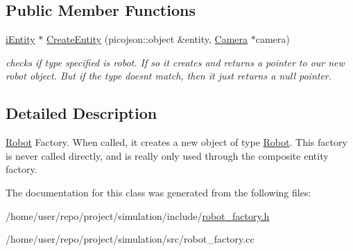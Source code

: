 \subsection*{Public Member Functions}
\begin{DoxyCompactItemize}
\item 
\mbox{\label{classRobotFactory_aa0428ce050880b0ff11429df875664ee}} 
\hyperlink{classiEntity}{i\+Entity} $\ast$ \hyperlink{classRobotFactory_aa0428ce050880b0ff11429df875664ee}{Create\+Entity} (picojson\+::object \&entity, \hyperlink{classCamera}{Camera} $\ast$camera)
\begin{DoxyCompactList}\small\item\em checks if type specified is robot. If so it creates and returns a pointer to our new robot object. But if the type doesn\textquotesingle{}t match, then it just returns a null pointer. \end{DoxyCompactList}\end{DoxyCompactItemize}


\subsection{Detailed Description}
\hyperlink{classRobot}{Robot} Factory. When called, it creates a new object of type \hyperlink{classRobot}{Robot}. This factory is never called directly, and is really only used through the composite entity factory. 

The documentation for this class was generated from the following files\+:\begin{DoxyCompactItemize}
\item 
/home/user/repo/project/simulation/include/\hyperlink{robot__factory_8h}{robot\+\_\+factory.\+h}\item 
/home/user/repo/project/simulation/src/robot\+\_\+factory.\+cc\end{DoxyCompactItemize}
